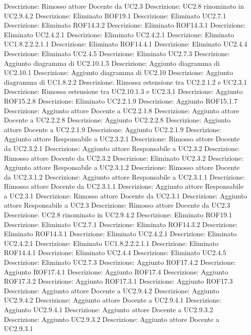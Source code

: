 Descrizione: Rimosso attore Docente da UC2.3 
Descrizione: UC2.8 rinominato in UC2.9.4.2 
Descrizione: Eliminato ROF19.1 
Descrizione: Eliminato UC2.7.1 
Descrizione: Eliminato ROF14.3.2 
Descrizione: Eliminato ROF14.3.1 
Descrizione: Eliminato UC2.4.2.1 
Descrizione: Eliminato UC2.4.2.1 
Descrizione: Eliminato UC1.8.2.2.2.1.1 
Descrizione: Eliminato ROF14.4.1 
Descrizione: Eliminato UC2.4.4 
Descrizione: Eliminato UC2.4.5 
Descrizione: Eliminato UC2.7.3 
Descrizione: Aggiunto diagramma di UC2.10.1.5 
Descrizione: Aggiunto diagramma di UC2.10.1 
Descrizione: Aggiunto diagramma di UC2.10 
Descrizione: Aggiunto diagramma di UC1.8.2.2 
Descrizione: Rimossa estensione tra UC2.2.1.2 e UC2.3.1 
Descrizione: Rimossa estensione tra UC2.10.1.3 e UC2.3.1 
Descrizione: Aggiunto ROF15.2.8 
Descrizione: Eliminato UC2.2.1.9 
Descrizione: Aggiunto ROF15.1.7 
Descrizione: Aggiunto attore Docente a UC2.2.1.8 
Descrizione: Aggiunto attore Docente a UC2.2.2.8 
Descrizione: Aggiunto UC2.2.2.8 
Descrizione: Aggiunto attore Docente a UC2.2.1.9 
Descrizione: Aggiunto UC2.2.1.9 
Descrizione: Aggiunto attore Responsabile a UC2.3.2.1 
Descrizione: Rimosso attore Docente da UC2.3.2.1 
Descrizione: Aggiunto attore Responsabile a UC2.3.2 
Descrizione: Rimosso attore Docente da UC2.3.2 
Descrizione: Eliminato UC2.3.2 
Descrizione: Aggiunto attore Responsabile a UC2.3.1.2 
Descrizione: Rimosso attore Docente da UC2.3.1.2 
Descrizione: Aggiunto attore Responsabile a UC2.3.1.1 
Descrizione: Rimosso attore Docente da UC2.3.1.1 
Descrizione: Aggiunto attore Responsabile a UC2.3.1 
Descrizione: Rimosso attore Docente da UC2.3.1 
Descrizione: Aggiunto attore Responsabile a UC2.3 
Descrizione: Rimosso attore Docente da UC2.3 
Descrizione: UC2.8 rinominato in UC2.9.4.2 
Descrizione: Eliminato ROF19.1 
Descrizione: Eliminato UC2.7.1 
Descrizione: Eliminato ROF14.3.2 
Descrizione: Eliminato ROF14.3.1 
Descrizione: Eliminato UC2.4.2.1 
Descrizione: Eliminato UC2.4.2.1 
Descrizione: Eliminato UC1.8.2.2.2.1.1 
Descrizione: Eliminato ROF14.4.1 
Descrizione: Eliminato UC2.4.4 
Descrizione: Eliminato UC2.4.5 
Descrizione: Eliminato UC2.7.3 
Descrizione: Aggiunto ROF17.4.2 
Descrizione: Aggiunto ROF17.4.1 
Descrizione: Aggiunto ROF17.4 
Descrizione: Aggiunto ROF17.3.2 
Descrizione: Aggiunto ROF17.3.1 
Descrizione: Aggiunto ROF17.3 
Descrizione: Aggiunto attore Docente a UC2.9.4.2 
Descrizione: Aggiunto UC2.9.4.2 
Descrizione: Aggiunto attore Docente a UC2.9.4.1 
Descrizione: Aggiunto UC2.9.4.1 
Descrizione: Aggiunto attore Docente a UC2.9.3.2 
Descrizione: Aggiunto UC2.9.3.2 
Descrizione: Aggiunto attore Docente a UC2.9.3.1 

